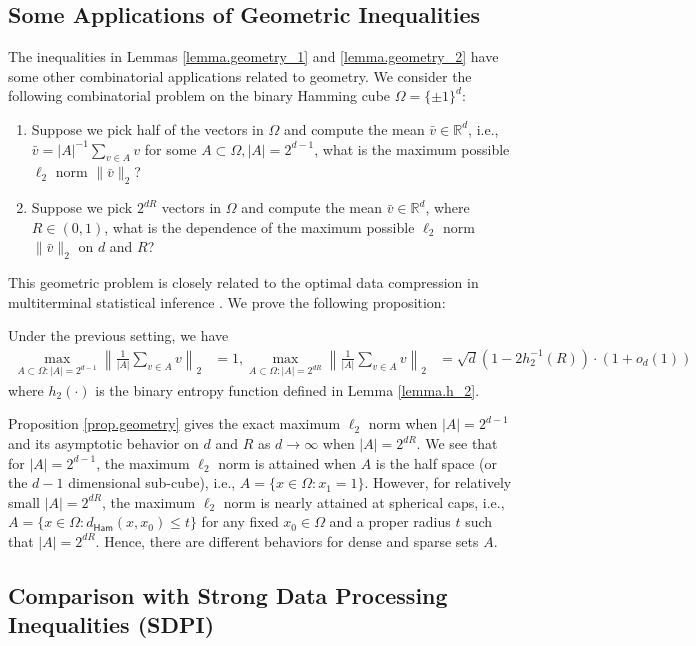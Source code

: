 \documentclass[final,12pt]{colt2018} %
\def \bR {\mathbb{R}}
\begin{document}
\subsection{Some Applications of Geometric Inequalities}
The inequalities in Lemmas \ref{lemma.geometry_1} and \ref{lemma.geometry_2} have some other combinatorial applications related to geometry. We consider the following combinatorial problem on the binary Hamming cube $\Omega=\{\pm1\}^d$:
\begin{enumerate}
	\item Suppose we pick half of the vectors in $\Omega$ and compute the mean $\bar{v}\in \bR^d$, i.e., $\bar{v}=|A|^{-1}\sum_{v\in A} v$ for some $A\subset \Omega, |A|=2^{d-1}$, what is the maximum possible $\ell_2$ norm $\|\bar{v}\|_2$?
	\item Suppose we pick $2^{dR}$ vectors in $\Omega$ and compute the mean $\bar{v}\in \bR^d$, where $R\in (0,1)$, what is the dependence of the maximum possible $\ell_2$ norm $\|\bar{v}\|_2$ on $d$ and $R$?
\end{enumerate}
This geometric problem is closely related to the optimal data compression in multiterminal statistical inference \cite{amari2011optimal}. We prove the following proposition:
\begin{proposition}\label{prop.geometry}
	Under the previous setting, we have
	\begin{align*}
	\max_{A\subset \Omega: |A|=2^{d-1}} \left\| \frac{1}{|A|}\sum_{v\in A}v \right\|_2 &= 1,
	\max_{A\subset \Omega: |A|=2^{dR}} \left\| \frac{1}{|A|}\sum_{v\in A}v \right\|_2 &= \sqrt{d}(1-2h_2^{-1}(R)) \cdot (1+o_d(1))
	\end{align*}
	where $h_2(\cdot)$ is the binary entropy function defined in Lemma \ref{lemma.h_2}. 
\end{proposition}

Proposition \ref{prop.geometry} gives the exact maximum $\ell_2$ norm when $|A|=2^{d-1}$ and its asymptotic behavior on $d$ and $R$ as $d\to\infty$ when $|A|=2^{dR}$. We see that for $|A|=2^{d-1}$, the maximum $\ell_2$ norm is attained when $A$ is the half space (or the $d-1$ dimensional sub-cube), i.e., $A=\{x\in \Omega: x_1=1\}$. However, for relatively small $|A|=2^{dR}$, the maximum $\ell_2$ norm is nearly attained at spherical caps, i.e., $A=\{x\in \Omega: d_{\mathsf{Ham}}(x,x_0)\le t \}$ for any fixed $x_0\in \Omega$ and a proper radius $t$ such that $|A|=2^{dR}$. Hence, there are different behaviors for dense and sparse sets $A$.


\subsection{Comparison with Strong Data Processing Inequalities (SDPI)}
\end{document}
